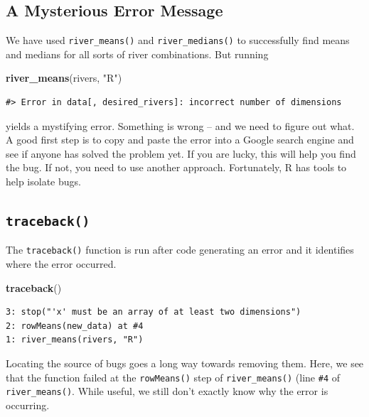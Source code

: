 \documentclass[
]{book}
\newenvironment{Shaded}{\begin{snugshade}}{\end{snugshade}}
\newcommand{\KeywordTok}[1]{\textcolor[rgb]{0.13,0.29,0.53}{\textbf{#1}}}
\newcommand{\NormalTok}[1]{#1}
\newcommand{\StringTok}[1]{\textcolor[rgb]{0.31,0.60,0.02}{#1}}
\begin{document}
\hypertarget{a-mysterious-error-message}{%
\subsection{A Mysterious Error Message}\label{a-mysterious-error-message}}

We have used \texttt{river\_means()} and \texttt{river\_medians()} to successfully find means and medians for all sorts of river combinations. But running

\begin{Shaded}
\begin{Highlighting}[]
\KeywordTok{river_means}\NormalTok{(rivers, }\StringTok{"R"}\NormalTok{)}
\end{Highlighting}
\end{Shaded}

\begin{verbatim}
#> Error in data[, desired_rivers]: incorrect number of dimensions
\end{verbatim}

yields a mystifying error. Something is wrong -- and we need to figure out what. A good first step is to copy and paste the error into a Google search engine and see if anyone has solved the problem yet. If you are lucky, this will help you find the bug. If not, you need to use another approach. Fortunately, R has tools to help isolate bugs.

\hypertarget{traceback}{%
\subsection{\texorpdfstring{\texttt{traceback()}}{traceback()}}\label{traceback}}

The \texttt{traceback()} function is run after code generating an error and it identifies where the error occurred.

\begin{Shaded}
\begin{Highlighting}[]
\KeywordTok{traceback}\NormalTok{()}
\end{Highlighting}
\end{Shaded}

\begin{verbatim}
3: stop("'x' must be an array of at least two dimensions")
2: rowMeans(new_data) at #4
1: river_means(rivers, "R")
\end{verbatim}

Locating the source of bugs goes a long way towards removing them. Here, we see that the function failed at the \texttt{rowMeans()} step of \texttt{river\_means()} (line \texttt{\#4} of \texttt{river\_means()}. While useful, we still don't exactly know why the error is occurring.
\end{document}

